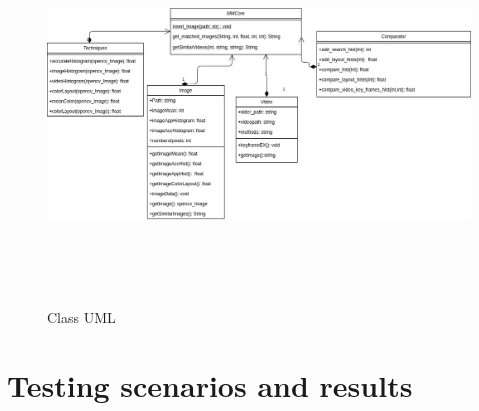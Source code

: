 \begin{figure}[H]
    \centering
    \includegraphics[width=135mm,height=100mm]{Images/system_design.jpg}
    \caption{Class  UML}
  \end{figure}



\section{Testing scenarios and results}

